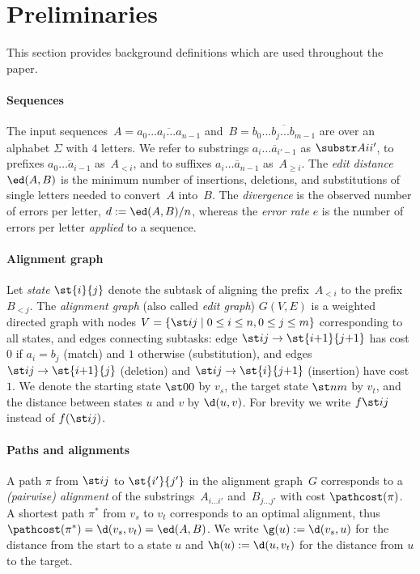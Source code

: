\section{Preliminaries}\label{sec:preliminaries}

This section provides background definitions which are used throughout the
paper.

\paragraph{Sequences}
The input sequences~$A = \overline{a_0 ... a_i ... a_{n-1}}$ and~$B =
\overline{b_0 ... b_j ... b_{m-1}}$ are over an alphabet $\Sigma$ with
$4$ letters. We refer to substrings $\overline{a_i \dots a_{i'-1}}$ as
$\substr Ai{i'}$, to prefixes $\overline{a_0 \dots a_{i-1}}$ as~$A_{<i}$, and to
suffixes $\overline{a_i \dots a_{n-1}}$ as~$A_{\geq i}$. The \emph{edit
distance} $\ed(A,B)$ is the minimum number of insertions, deletions, and
substitutions of single letters needed to convert~$A$ into~$B$.  The
\emph{divergence} is the observed number of errors per letter, $d:=\ed(A,B)/n$,
whereas the \emph{error rate} $e$ is the number of errors per letter \emph{applied}
to a sequence.

\paragraph{Alignment graph}
Let \emph{state} $\st{i}{j}$ denote the subtask of aligning the prefix~$A_{<i}$
to the prefix~$B_{<j}$. The \emph{alignment graph} (also called \emph{edit
graph}) $G(V,E)$ is a weighted directed graph with nodes $V = \{\st ij \mid
{0\leq i \leq n}, {0\leq j\leq m}\}$ corresponding to all states, and edges
connecting subtasks: edge ${\st ij \to \st{i{+}1}{j{+}1}}$ has cost $0$ if ${a_i
= b_j}$ (match) and $1$ otherwise (substitution), and edges ${\st ij \to
\st{i{+}1}{j}}$ (deletion) and ${\st ij \to\st{i}{j{+}1}}$ (insertion) have cost
$1$. We denote the starting state $\st 00$ by $v_s$, the target state $\st nm$ by
$v_t$, and the distance between states $u$ and $v$ by $\d(u,v)$. For brevity we
write $f \st ij$ instead of $f(\st ij)$.

\paragraph{Paths and alignments}
A path $\pi$ from $\st ij$ to $\st{i'}{j'}$ in the alignment graph~$G$
corresponds to a \emph{(pairwise) alignment} of the substrings~$A_{i \dots i'}$
and~$B_{j \dots j'}$ with cost $\pathcost(\pi)$. A shortest path $\pi^*$ from
$v_s$ to $v_t$ corresponds to an optimal alignment, thus $\pathcost(\pi^*) =
\d(v_s, v_t) = \ed(A, B)$. We write $\g(u) := \d(v_s, u)$ for the distance from
the start to a state $u$ and $\h(u) := \d(u, v_t)$ for the distance from $u$ to
the target.

